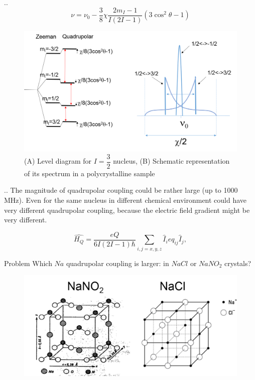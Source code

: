 \documentclass[handout]{beamer}
\begin{document}
\begin{frame}{\thesection.\thesubsection. \insertsubsection}
    	\begin{equation}
    	\nu = \nu_0 -\dfrac{3}{8} \chi \dfrac{2 m_I -1}{I(2I -1)}(3 \cos^2 \theta - 1)
    	\end{equation}
    	
    	\begin{figure}
    		\centering
    		\includegraphics[scale=0.4]{figures/Quadrupole2.png}
    		\caption{(A) Level diagram for $I=\dfrac{3}{2}$ nucleus, (B) Schematic representation of its spectrum in a polycrystalline sample}
    	\end{figure}
\end{frame}

\begin{frame}[shrink=5]{\thesection.\thesubsection. \insertsubsection}
  The magnitude of quadrupolar coupling could be rather large (up to 1000 MHz). Even for the same nucleus in different chemical environment could have very different quadrupolar coupling, because the electric field gradient might be very different.
  
  \begin{equation}
  \hat{H_Q} = \dfrac{eQ}{6I(2I-1)\hbar} \sum_{i,j=x,y,z} \hat{I}_i e q_{ij}  \hat{I}_j, 
  \end{equation}
  
  \begin{block}{Problem}
  	Which $Na$ quadrupolar coupling is larger: in $NaCl$ or $NaNO_2$ crystals?
  \end{block}

	\begin{figure}
	\centering
	\includegraphics[scale=0.5]{figures/Quadrupole3.png}
    \end{figure}

\end{frame}
\end{document}
